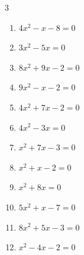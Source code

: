 \begin{multicols}{3}
\begin{enumerate}

  \item $4x^{2}-x-8=0$


  \item $3x^{2}-5x=0$


  \item $8x^{2}+9x-2=0$


  \item $9x^{2}-x-2=0$


  \item $4x^{2}+7x-2=0$


\columnbreak %

  \item $4x^{2}-3x=0$


  \item $x^{2}+7x-3=0$


  \item $x^{2}+x-2=0$

        \phantom{$\displaystyle x=1, \; -2$}

  \item $x^{2}+8x=0$

        \phantom{$\displaystyle x=0, \; -8$}

  \item $5x^{2}+x-7=0$


  \item $8x^{2}+5x-3=0$


  \item $x^{2}-4x-2=0$


\columnbreak %


\end{enumerate}
\end{multicols}

